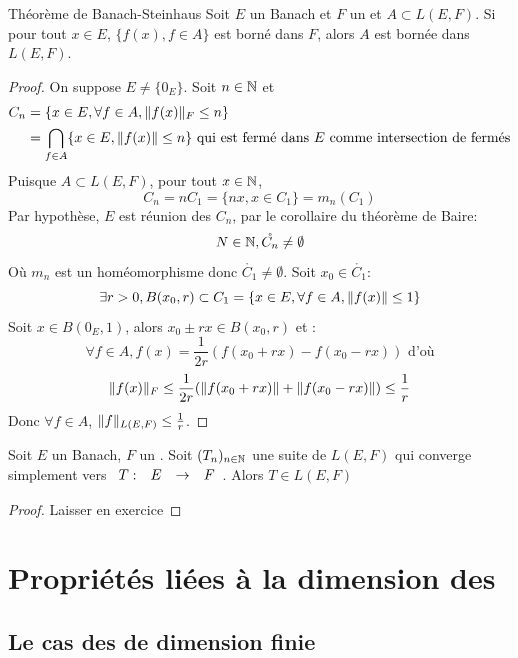 \documentclass[]{report}
\begin{document}
    \begin{tm}{Théorème de Banach-Steinhaus}{}
        Soit $E$ un Banach et $F$ un \evn et $A\subset L(E,F)$. Si pour tout $x\in E$, $\{f(x),f\in A\}$ est borné dans $F$, alors $A$ est bornée dans $L(E,F)$.\\
    \end{tm}

    \begin{proof}
        On suppose $E\neq \{0_E\}$. Soit $n\in \mathbb{N}$ et 
        \begin{align*}
            C_n&=\{x\in E,\forall f\in A,\lVert f(x) \rVert_F\le n\}\\
            &=\bigcap_{f\in A}\{x\in E,\lVert f(x) \rVert\le n\}\text{ qui est fermé dans $E$ comme intersection de fermés}
        \end{align*}
        Puisque $A\subset L(E,F)$, pour tout $x\in \mathbb{N}$,
        \[C_n=nC_1=\{nx,x\in C_1\}=m_n(C_1)\]
        Par hypothèse, $E$ est réunion des $C_n$, par le corollaire du théorème de Baire:
        \[N\in \mathbb{N},\mathring{C_n}\neq\emptyset\]
        Où $m_n$ est un homéomorphisme donc $\mathring{C_1}\neq \emptyset$. Soit $x_0\in \mathring{C_1}$:\\
        \[\exists r>0, B(x_0,r)\subset C_1=\{x\in E,\forall f\in A,\lVert f(x) \rVert\le 1\}\]
        Soit $x\in B(0_E,1)$, alors $x_0\pm rx\in B(x_0,r)$ et :
        \[\forall f\in A, f(x)=\frac{1}{2r}(f(x_0+rx)-f(x_0-rx))\text{ d'où}\]
        \[\lVert f(x) \rVert_F\le \frac{1}{2r}(\lVert f(x_0+rx) \rVert+\lVert f(x_0-rx) \rVert)\le \frac{1}{r}\]
        Donc $\forall f\in A$, $\lVert f \rVert_{L(E,F)}\le \frac{1}{r}$.
    \end{proof}

    \begin{cor}{}{}
        Soit $E$ un Banach, $F$ un \evn. Soit $(T_n)_{n\in\mathbb{N}}$ une suite de $L(E,F)$ qui converge simplement vers $\begin{array}{ccccc} T : & E & \to & F \end{array}$. Alors $T\in L(E,F)$
    \end{cor}

    \begin{proof}
        Laisser en exercice
    \end{proof}

    \section{Propriétés liées à la dimension des \evn}

    \subsection*{Le cas des \evn de dimension finie}
\end{document}
